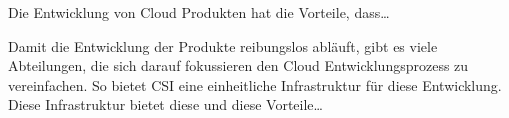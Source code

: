 \documentclass[../main.tex]{subfiles}
\begin{document}
Die Entwicklung von Cloud Produkten hat die Vorteile, dass\dots

Damit die Entwicklung der Produkte reibungslos abläuft, gibt es viele Abteilungen, die sich darauf fokussieren den Cloud Entwicklungsprozess zu vereinfachen.
So bietet \acrshort{CSI} eine einheitliche Infrastruktur für diese Entwicklung. Diese Infrastruktur bietet diese und diese Vorteile…
\end{document}
